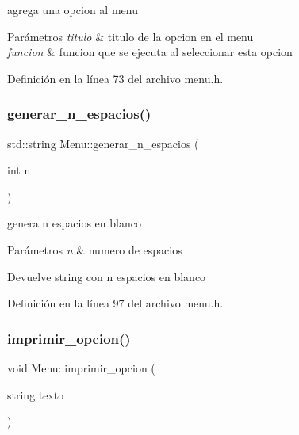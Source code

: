 agrega una opcion al menu 


\begin{DoxyParams}{Parámetros}
{\em titulo} & titulo de la opcion en el menu \\
\hline
{\em funcion} & funcion que se ejecuta al seleccionar esta opcion \\
\hline
\end{DoxyParams}


Definición en la línea 73 del archivo menu.\+h.

\mbox{\label{classMenu_a67ebd3e3bcfe45c99a7c0ff13a5c3ebb}} 
\subsubsection{\texorpdfstring{generar\+\_\+n\+\_\+espacios()}{generar\_n\_espacios()}}
{\footnotesize\ttfamily std\+::string Menu\+::generar\+\_\+n\+\_\+espacios (\begin{DoxyParamCaption}\item[{int}]{n }\end{DoxyParamCaption})\hspace{0.3cm}{\ttfamily [inline]}}



genera n espacios en blanco 


\begin{DoxyParams}{Parámetros}
{\em n} & numero de espacios \\
\hline
\end{DoxyParams}
\begin{DoxyReturn}{Devuelve}
string con n espacios en blanco 
\end{DoxyReturn}


Definición en la línea 97 del archivo menu.\+h.

\mbox{\label{classMenu_aa964e3e58eb5c6b63ebadd7f2ec6751a}} 
\subsubsection{\texorpdfstring{imprimir\+\_\+opcion()}{imprimir\_opcion()}}
{\footnotesize\ttfamily void Menu\+::imprimir\+\_\+opcion (\begin{DoxyParamCaption}\item[{string}]{texto }\end{DoxyParamCaption})\hspace{0.3cm}{\ttfamily [inline]}}



